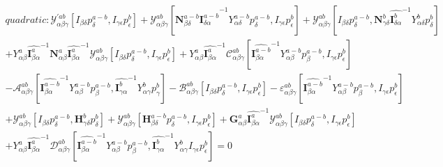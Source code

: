 \documentclass{Note}
\begin{document}
\begin{equation}
\begin{aligned}
quadratic:\mathcal{Y}_{\alpha\beta\gamma}^{'ab}[I_{\beta\delta}p_{\delta}^{a-b},I_{\gamma\epsilon} p_{\epsilon}^{b}]+\mathcal{Y}_{\alpha\beta\gamma}^{ab}[\textbf{N}_{\beta\delta}^{a-b} {\widehat{\textbf{I}_{\delta \alpha}^{a-b}}}^{-1}  Y_{\alpha\delta}^{a-b} p_\delta^{a-b} ,I_{\gamma\epsilon} p_{\epsilon}^{b}]+\mathcal{Y}_{\alpha\beta\gamma}^{ab}[I_{\beta\delta}p_{\delta}^{a-b},\textbf{N}_{\gamma\delta}^{b} {\widehat{\textbf{I}_{\delta \alpha}^{b}}}^{-1}  Y_{\alpha\delta}^{b} p_\delta^{b} ]\\
+Y_{\alpha\beta}^{a} {\widehat{\textbf{I}_{\beta \alpha}^a}}^{-1}   \textbf{N}_{\alpha\beta}^a {\widehat{\textbf{I}_{\beta \alpha}^a}}^{-1} \mathcal{Y}_{\alpha\beta\gamma}^{ab}[I_{\beta\delta}p_{\delta}^{a-b},I_{\gamma\epsilon} p_{\epsilon}^{b}] +Y_{\alpha\beta}^{a}{\widehat{\textbf{I}_{\beta \alpha}^a}}^{-1}  \mathcal{C}_{\alpha\beta\gamma}^{ab}[{\widehat{\textbf{I}_{\beta \alpha}^{a-b}}}^{-1}  Y_{\alpha\beta}^{a-b} p_\beta^{a-b} ,I_{\gamma\epsilon} p_{\epsilon}^{b}]\\
-\mathcal{A}_{\alpha\beta\gamma}^{ab}[{\widehat{\textbf{I}_{\beta \alpha}^{a-b}}}^{-1}  Y_{\alpha\beta}^{a-b} p_\beta^{a-b},{\widehat{\textbf{I}_{\gamma \alpha}^{b}}}^{-1}  Y_{\alpha\gamma}^{b} p_\gamma^{b}]-\mathcal{B}_{\alpha\beta\gamma}^{ab}[I_{\beta\delta}p_{\delta}^{a-b},I_{\gamma\epsilon} p_{\epsilon}^{b}]-\varepsilon_{\alpha\beta\gamma}^{ab}[{\widehat{\textbf{I}_{\beta \alpha}^{a-b}}}^{-1}  Y_{\alpha\beta}^{a-b} p_\beta^{a-b} ,I_{\gamma\epsilon} p_{\epsilon}^{b}]\\
+\mathcal{Y}_{\alpha\beta\gamma}^{ab}[I_{\beta\delta}p_{\delta}^{a-b},\textbf{H}_{\gamma\delta}^{b} p_{\delta}^{b}]+\mathcal{Y}_{\alpha\beta\gamma}^{ab}[\textbf{H}_{\beta\delta}^{a-b} p_{\delta}^{a-b},I_{\gamma\epsilon} p_{\epsilon}^{b}]+\textbf{G}_{\alpha\beta}^a  {\widehat{\textbf{I}_{\beta \alpha}^a}}^{-1} \mathcal{Y}_{\alpha\beta\gamma}^{ab}[I_{\beta\delta}p_{\delta}^{a-b},I_{\gamma\epsilon} p_{\epsilon}^{b}] \\
+Y_{\alpha\beta}^{a} {\widehat{\textbf{I}_{\beta \alpha}^a}}^{-1}  \mathcal{D}_{\alpha\beta\gamma}^{ab}[{\widehat{\textbf{I}_{\beta \alpha}^{a-b}}}^{-1}  Y_{\alpha\beta}^{a-b} p_\beta^{a-b},{\widehat{\textbf{I}_{\gamma \alpha}^{b}}}^{-1}  Y_{\alpha\gamma}^{b} I_{\gamma\epsilon} p_{\epsilon}^{b}]=0
\end{aligned}
\end{equation}
\end{document}
